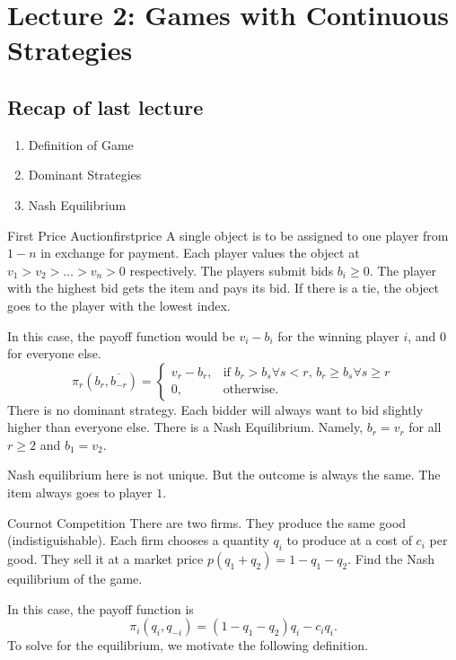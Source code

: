 \section{Lecture 2: Games with Continuous Strategies}
\newsection
\subsection*{Recap of last lecture}
\begin{enumerate}
    \item Definition of Game
    \item Dominant Strategies
    \item Nash Equilibrium
\end{enumerate}

\begin{aexample}{First Price Auction}{firstprice}
    A single object is to be assigned to one player from $1-n$ in exchange for payment.
    Each player values the object at $v_1>v_2>\ldots>v_n>0$ respectively.
    The players submit bids $b_i\geq 0$. The player with the highest bid gets the item and pays its bid. If there is a tie, the object goes to the player with the lowest index.
\end{aexample}

In this case, the payoff function would be $v_i-b_i$ for the winning player $i$, and $0$ for everyone else.
\[
\pi_r(b_r,\overline{b_{-r}})=\begin{cases}
    v_r-b_r, & \textrm{if $b_r>b_s\forall s<r$, $b_r\geq b_s \forall s\geq r$}\\
    0, & \textrm{otherwise.}
\end{cases}
\]
There is no dominant strategy. Each bidder will always want to bid slightly higher than everyone else. There is a Nash Equilibrium. Namely, $b_r=v_r$ for all $r\geq 2$ and $b_1=v_2$. 
\begin{remark}
    Nash equilibrium here is not unique. But the outcome is always the same. The item always goes to player $1$.
\end{remark}
\begin{aexample}{Cournot Competition}{}
    There are two firms. They produce the same good (indistiguishable). Each firm chooses a quantity $q_{i}$ to produce at a cost of $c_i$ per good. They sell it at a market price $p(q_1+q_2)=1-q_1-q_2.$ Find the Nash equilibrium of the game.
\end{aexample}
In this case, the payoff function is \[
\pi_i(q_i,q_{-i})=(1-q_1-q_2)q_i-c_i q_i.
\]
To solve for the equilibrium, we motivate the following definition.

